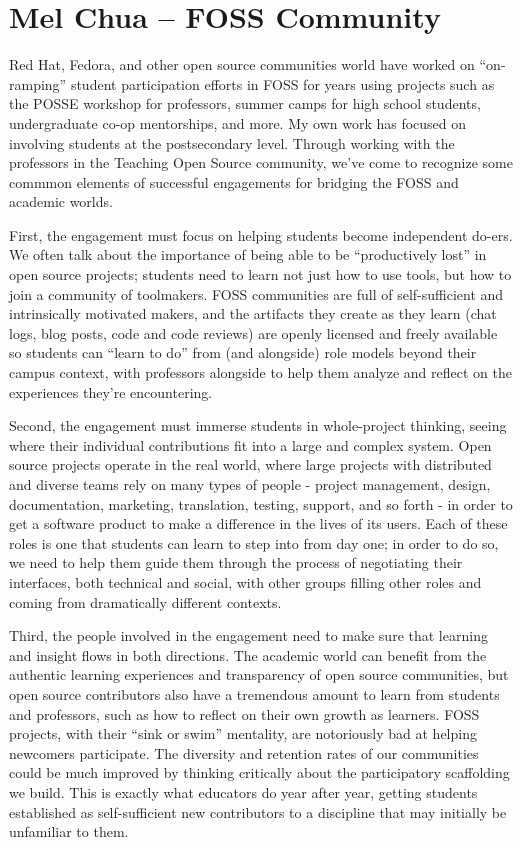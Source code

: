 \documentclass{sig-alternate}
\begin{document}
\section{Mel Chua -- FOSS Community}

Red Hat, Fedora, and other open source communities world have worked on ``on-ramping'' student participation efforts in FOSS for years using projects such as the POSSE workshop for professors, summer camps for high school students, undergraduate co-op mentorships, and more.  My own work has focused on involving students at the postsecondary level.  Through working with the professors in the Teaching Open Source community, we've come to recognize some commmon elements of successful engagements for bridging the FOSS and academic worlds.

First, the engagement must focus on helping students become independent do-ers. We often talk about the importance of being able to be ``productively lost'' in open source projects; students need to learn not just how to use tools, but how to join a community of toolmakers. FOSS communities are full of self-sufficient and intrinsically motivated makers, and the artifacts they create as they learn (chat logs, blog posts, code and code reviews) are openly licensed and freely available so students can ``learn to do'' from (and alongside) role models beyond their campus context, with professors alongside to help them analyze and reflect on the experiences they're encountering.

Second, the engagement must immerse students in whole-project thinking, seeing where their individual contributions fit into a large and complex system. Open source projects operate in the real world, where large projects with distributed and diverse teams rely on many types of people - project management, design, documentation, marketing, translation, testing, support, and so forth - in order to get a software product to make a difference in the lives of its users. Each of these roles is one that students can learn to step into from day one; in order to do so, we need to help them guide them through the process of negotiating their interfaces, both technical and social, with other groups filling other roles and coming from dramatically different contexts.

Third, the people involved in the engagement need to make sure that learning and insight flows in both directions. The academic world can benefit from the authentic learning experiences and transparency of open source communities, but open source contributors also have a tremendous amount to learn from students and professors, such as how to reflect on their own growth as learners. FOSS projects, with their ``sink or swim'' mentality, are notoriously bad at helping newcomers participate. The diversity and retention rates of our communities could be much improved by thinking critically about the participatory scaffolding we build.  This is exactly what educators do year after year, getting students established as self-sufficient new contributors to a discipline that may initially be unfamiliar to them.
\end{document}
